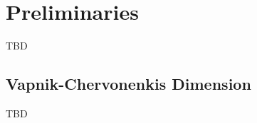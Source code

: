 \section{Preliminaries}\label{sec:prelims}
\XXX TBD

\subsection{Vapnik-Chervonenkis Dimension}\label{sec:vcdim}
\XXX TBD

